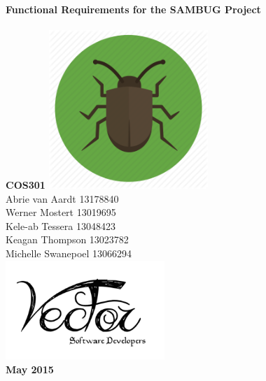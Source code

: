 \documentclass[11pt,a4paper,titlepage]{article}
\begin{document}

\begin{titlepage}
    \centering
    \vfill
    {\bfseries\Huge
         Functional Requirements for the SAMBUG Project\\
      \hfill\\
         \Large COS301
        \vskip2cm
        \includegraphics[width=6cm]{sambug} \\

    }    
    \vfill
        Abrie van Aardt 13178840\\
		Werner Mostert 13019695\\
		Kele-ab Tessera 13048423\\
		Keagan Thompson 13023782\\
		Michelle Swanepoel 13066294\\
    
    
    \vfill
    \includegraphics[width=6cm]{logo} \\
    \textbf{May 2015}
    \vfill
\end{titlepage}
	
    


\tableofcontents


\pagebreak
\end{document}
